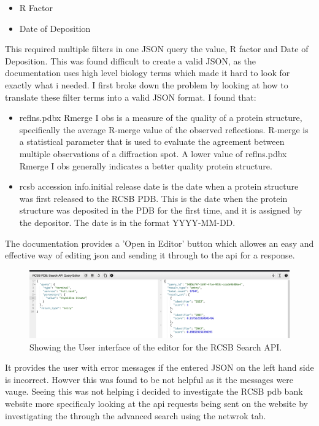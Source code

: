 \documentclass[]{final_report}
\begin{document}
\begin{itemize}
    \item R Factor
    \item Date of Deposition
\end{itemize}

This required multiple filters in one JSON query the value, R factor and Date of Deposition. This was found difficult to create a valid JSON, as the documentation uses high level biology terms which made it hard to look for exactly what i needed. I first broke down the problem by looking at how to translate these filter terms into a valid JSON format. I found that: 

\begin{itemize}
    \item reflns.pdbx Rmerge I obs is a measure of the quality of a protein structure, specifically the average R-merge value of the observed reflections. R-merge is a statistical parameter that is used to evaluate the agreement between multiple observations of a diffraction spot. A lower value of reflns.pdbx Rmerge I obs generally indicates a better quality protein structure.
    \item rcsb accession info.initial release date is the date when a protein structure was first released to the RCSB PDB. This is the date when the protein structure was deposited in the PDB for the first time, and it is assigned by the depositor. The date is in the format YYYY-MM-DD.
\end{itemize}

\clearpage

The documentation provides a 'Open in Editor' button which allowes an easy and effective way of editing json and sending it through to the api for a response.

\begin{figure}[ht]
    \centering
    \includegraphics[width=1\textwidth]{SearchAPIEditor.png}
    \caption{\label{fig:SearchAPIEditor}Showing the User interface of the editor for the RCSB Search API.}
\end{figure}

It provides the user with error messages if the entered JSON on the left hand side is incorrect. Howver this was found to be not helpful as it the messages were vauge. Seeing this was not helping i decided to investigate the RCSB pdb bank website more specificaly looking at the api requests being sent on the website by investigating the through the advanced search using the netwrok tab.
\end{document}
